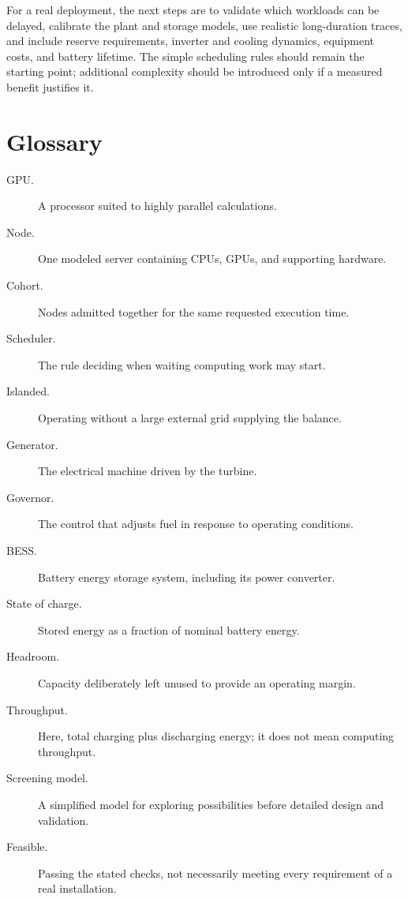 \documentclass[11pt]{article}
\begin{document}
For a real deployment, the next steps are to validate which workloads
can be delayed, calibrate the plant and storage models, use realistic
long-duration traces, and include reserve requirements, inverter and
cooling dynamics, equipment costs, and battery lifetime.
The simple scheduling rules should remain the starting point; additional
complexity should be introduced only if a measured benefit justifies it.

\appendix
\section{Glossary}
\begin{description}
\item[GPU.] A processor suited to highly parallel calculations.
\item[Node.] One modeled server containing CPUs, GPUs, and supporting hardware.
\item[Cohort.] Nodes admitted together for the same requested execution time.
\item[Scheduler.] The rule deciding when waiting computing work may start.
\item[Islanded.] Operating without a large external grid supplying the balance.
\item[Generator.] The electrical machine driven by the turbine.
\item[Governor.] The control that adjusts fuel in response to operating conditions.
\item[BESS.] Battery energy storage system, including its power converter.
\item[State of charge.] Stored energy as a fraction of nominal battery energy.
\item[Headroom.] Capacity deliberately left unused to provide an operating margin.
\item[Throughput.] Here, total charging plus discharging energy; it does not mean
computing throughput.
\item[Screening model.] A simplified model for exploring possibilities before
detailed design and validation.
\item[Feasible.] Passing the stated checks, not necessarily meeting every
requirement of a real installation.
\end{description}
\end{document}
